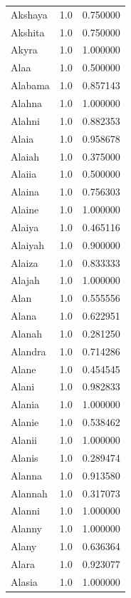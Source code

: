\documentclass[
  letterpaper,
  DIV=11,
  numbers=noendperiod]{scrreprt}
\begin{document}
\begin{tabular}{lrr}
Akshaya         &   1.0 &   0.750000 \\
Akshita         &   1.0 &   0.750000 \\
Akyra           &   1.0 &   1.000000 \\
Alaa            &   1.0 &   0.500000 \\
Alabama         &   1.0 &   0.857143 \\
Alahna          &   1.0 &   1.000000 \\
Alahni          &   1.0 &   0.882353 \\
Alaia           &   1.0 &   0.958678 \\
Alaiah          &   1.0 &   0.375000 \\
Alaiia          &   1.0 &   0.500000 \\
Alaina          &   1.0 &   0.756303 \\
Alaine          &   1.0 &   1.000000 \\
Alaiya          &   1.0 &   0.465116 \\
Alaiyah         &   1.0 &   0.900000 \\
Alaiza          &   1.0 &   0.833333 \\
Alajah          &   1.0 &   1.000000 \\
Alan            &   1.0 &   0.555556 \\
Alana           &   1.0 &   0.622951 \\
Alanah          &   1.0 &   0.281250 \\
Alandra         &   1.0 &   0.714286 \\
Alane           &   1.0 &   0.454545 \\
Alani           &   1.0 &   0.982833 \\
Alania          &   1.0 &   1.000000 \\
Alanie          &   1.0 &   0.538462 \\
Alanii          &   1.0 &   1.000000 \\
Alanis          &   1.0 &   0.289474 \\
Alanna          &   1.0 &   0.913580 \\
Alannah         &   1.0 &   0.317073 \\
Alanni          &   1.0 &   1.000000 \\
Alanny          &   1.0 &   1.000000 \\
Alany           &   1.0 &   0.636364 \\
Alara           &   1.0 &   0.923077 \\
Alasia          &   1.0 &   1.000000 \\

\end{tabular}
\end{document}
